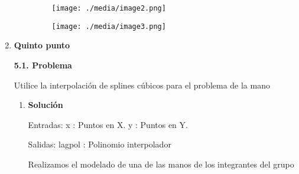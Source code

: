 \documentclass[12pt]{article}
\renewcommand{\_}{\kern-1.5pt\textunderscore\kern-1.5pt}
\begin{document}
\begin{enumerate}[label*={\fontsize{14pt}{14pt}\selectfont \textbf{\arabic*.}}]
\begin{enumerate}[label*={\fontsize{12pt}{12pt}\selectfont \textbf{\arabic*.}}]

\begin{figure}[H]
	\begin{Center}
		\texttt{[image: ./media/image2.png]}
	\end{Center}
\end{figure}



\par




\begin{figure}[H]
	\begin{Center}
		\texttt{[image: ./media/image3.png]}
	\end{Center}
\end{figure}



\par


\vspace{\baselineskip}

\end{enumerate}
	\item {\fontsize{14pt}{16.8pt}\selectfont \textbf{Quinto punto}\par}\par

\textbf{5.1. Problema}\par

Utilice la interpolación de splines cúbicos para el problema de la mano \par

\begin{enumerate}[label*={\fontsize{12pt}{12pt}\selectfont \textbf{\arabic*.}}]
	\item \textbf{Solución}\par

Entradas: x : Puntos en X. y : Puntos en Y.\par

Salidas: lag\_pol : Polinomio interpolador\par


\vspace{\baselineskip}
Realizamos el modelado de una de las manos de los integrantes del grupo\par



\end{enumerate}
\end{enumerate}
\end{document}

